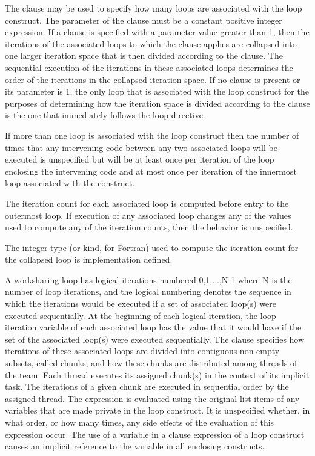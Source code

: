 The  clause may be used to specify how many loops are
associated with the loop construct. The parameter of the 
clause must be a constant positive integer expression. If a 
clause is specified with a parameter value greater than 1, then the
iterations of the associated loops to which the clause applies are collapsed
into one larger iteration space that is then divided according
to the  clause. The sequential execution of the iterations
in these associated loops determines the order of the iterations in the
collapsed iteration space. If no  clause is present or its
parameter is 1, the only loop that is associated with the loop construct
for the purposes of determining how the iteration space is divided according
to the  clause is the one that immediately follows the
loop directive.

If more than one loop is associated with the loop construct then the
number of times that any intervening code between any two associated
loops will be executed is unspecified but will be at least once per
iteration of the loop enclosing the intervening code and at most once
per iteration of the innermost loop associated with the construct.

The iteration count for each associated loop is computed before entry to the
outermost loop. If execution of any associated loop changes any of the values
used to compute any of the iteration counts, then the behavior is unspecified.

The integer type (or kind, for Fortran) used to compute the iteration count
for the collapsed loop is implementation defined.

 A worksharing loop has
logical iterations numbered 0,1,...,N-1 where N is the number of loop
iterations, and the logical numbering denotes the sequence in which
the iterations would be executed if a set of associated loop(s) were
executed sequentially.  At the beginning of each logical iteration,
the loop iteration variable of each associated loop has the value that
it would have if the set of the associated loop(s) were executed
sequentially.  The  clause specifies how iterations of
these associated loops are divided into contiguous non-empty subsets,
called chunks, and how these chunks are distributed among threads of
the team. Each thread executes its assigned chunk(s) in the context of
its implicit task.  The iterations of a given chunk are executed in
sequential order by the assigned thread.  The 
expression is evaluated using the original list items of any variables
that are made private in the loop construct. It is unspecified
whether, in what order, or how many times, any side effects of the
evaluation of this expression occur. The use of a variable in a
 clause expression of a loop construct causes an
implicit reference to the variable in all enclosing constructs.

